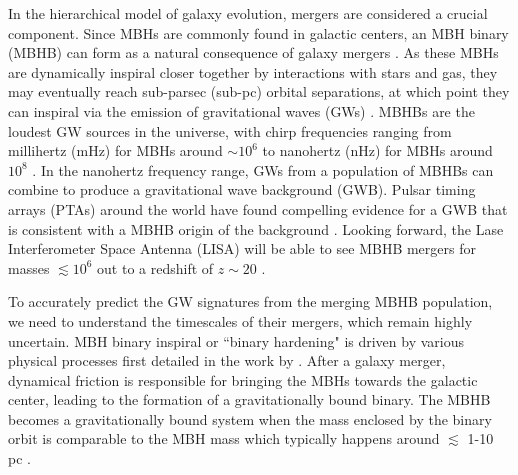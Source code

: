 \documentclass{book}
\begin{document}
In the hierarchical model of galaxy evolution, mergers are considered a crucial component. Since MBHs are commonly found in galactic centers, an MBH binary (MBHB) can form as a natural consequence of galaxy mergers \citep{Begelman1980}. As these MBHs are dynamically inspiral closer together by interactions with stars and gas, they may eventually reach sub-parsec (sub-pc) orbital separations, at which point they can inspiral via the emission of gravitational waves (GWs) \citep{PetersandMathews1964}. MBHBs are the loudest GW sources in the universe, with chirp frequencies ranging from millihertz (mHz) for MBHs around $\sim 10^6$ \msun to nanohertz (nHz) for MBHs around $10^8$ \msun \citep{Sesana2013}. In the nanohertz frequency range, GWs from a population of MBHBs can combine to produce a gravitational wave background (GWB). Pulsar timing arrays (PTAs) around the world have found compelling evidence for a GWB that is consistent with a MBHB origin of the background \citep{agazie_nanograv_2023,antoniadis_second_2023,reardon_search_2023,xu_searching_2023}. Looking forward, the Lase Interferometer Space Antenna (LISA) will be able to see MBHB mergers for masses  $\lesssim 10^6$  \msun out to a redshift of $z \sim 20$ \citep{amaroseoane2017laserinterferometerspaceantenna}. 

To accurately predict the GW signatures from the merging MBHB population, we need to understand the timescales of their mergers, which remain highly uncertain. MBH binary inspiral or ``binary hardening" is driven by various physical processes first detailed in the work by \citet{Begelman1980}. After a galaxy merger, dynamical friction \citep{Antonini2012} is responsible for bringing the MBHs towards the galactic center, leading to the formation of a gravitationally bound binary. The MBHB becomes a gravitationally bound system when the mass enclosed by the binary orbit is comparable to the MBH mass which typically happens around $\lesssim$ 1-10 pc \citep{begelman_massive_1980,quinlan_dynamical_1996,Yu_2002}.
\end{document}
